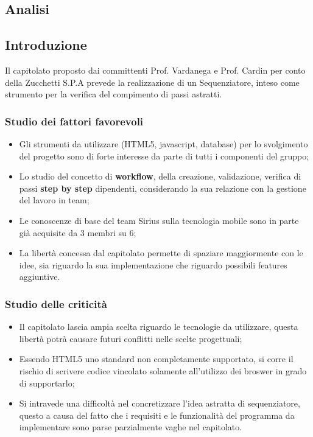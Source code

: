 \subsection{Analisi}
\subsection{Introduzione}
Il capitolato proposto dai committenti Prof. Vardanega e Prof. Cardin per conto della Zucchetti S.P.A prevede la realizzazione di un Sequenziatore, inteso come strumento per la verifica del compimento di passi astratti.
\subsubsection{Studio dei fattori favorevoli}
\begin{itemize}
\item Gli strumenti da utilizzare (HTML5, javascript, database) per lo svolgimento del progetto sono di forte interesse da parte di tutti i componenti del gruppo;
\item Lo studio del concetto di \textbf{workflow}, della creazione, validazione, verifica di passi \textbf{step by step} dipendenti, considerando la sua relazione con la gestione del lavoro in team;
\item Le conoscenze di base del team Sirius sulla tecnologia mobile sono in parte già acquisite da 3 membri su 6;
\item La libertà concessa dal capitolato permette di spaziare maggiormente con le idee, sia riguardo la sua implementazione che riguardo possibili features aggiuntive.
\end{itemize}
\subsubsection{Studio delle criticità}
\begin{itemize}
\item Il capitolato lascia ampia scelta riguardo le tecnologie da utilizzare, questa libertà potrà causare futuri conflitti nelle scelte progettuali;
\item Essendo HTML5 uno standard non completamente supportato, si corre il rischio di scrivere codice vincolato solamente all'utilizzo dei broswer in grado di supportarlo;
\item Si intravede una difficoltà nel concretizzare l'idea astratta di sequenziatore, questo a causa del fatto che i requisiti e le funzionalità del programma da implementare sono parse parzialmente vaghe nel capitolato.
\end{itemize}

